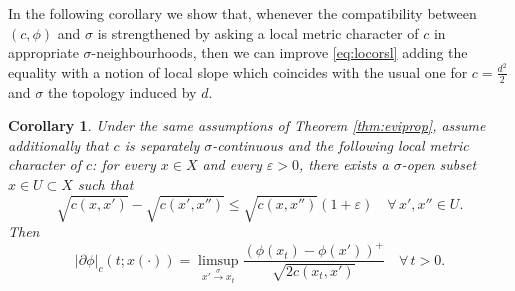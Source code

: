 \documentclass[reqno]{amsart}
\newcounter{results}[section]
\theoremstyle{plain}
\newtheorem{corollary}[results]{Corollary}
\theoremstyle{remark}
\theoremstyle{plain}
\numberwithin{equation}{section}
\theoremstyle{remark}
\newcommand{\eps}{\varepsilon}
\begin{document}
In the following corollary we show that, whenever the compatibility between $(c,\phi)$ and $\sigma$ is  strengthened  by asking a local metric character of $c$ in appropriate $\sigma$-neighbourhoods, then we can improve \eqref{eq:locorsl} adding the equality with a notion of local slope which coincides with the usual one for $c=\frac{d^2}{2}$ and $\sigma$ the topology induced by $d$.
\begin{corollary}\label{cor:metric_case} Under the same assumptions of Theorem \ref{thm:eviprop}, assume additionally that $c$ is separately $\sigma$-continuous and the following local metric character of $c$: for every $x \in X$ and every $\eps>0$, there exists a $\sigma$-open subset $x \in U \subset X$ such that
\begin{equation}\label{eq:def_locally_square_metric}
\sqrt{c(x,x')}-\sqrt{c(x',x'')} \le  \sqrt{c(x,x'')}(1+ \varepsilon ) \quad \forall \, x',x''\in U.
\end{equation}
Then
\[
|\partial \phi|_c(t;x(\cdot)) = \limsup_{x' \stackrel{\sigma}{\to} x_t} \frac{(\phi(x_t)-\phi(x'))^+}{\sqrt{2 c(x_t,x')}} \quad \forall \, t>0.
\]
\end{corollary}
\end{document}
